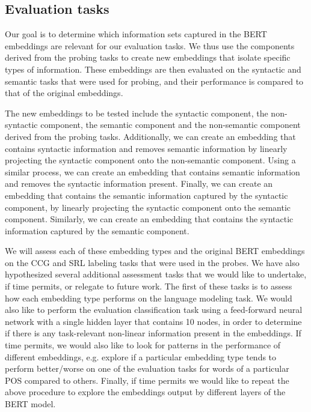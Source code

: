 \documentclass[11pt,a4paper]{article}
\begin{document}
\subsection{Evaluation tasks}

Our goal is to determine which information sets captured in the BERT embeddings are relevant for our evaluation tasks. We thus use the components derived from the probing tasks to create new embeddings that isolate specific types of information. These embeddings are then evaluated on the syntactic and semantic tasks that were used for probing, and their performance is compared to that of the original embeddings. 

The new embeddings to be tested include the syntactic component, the non-syntactic component, the semantic component and the non-semantic component derived from the probing tasks. Additionally, we can create an embedding that contains syntactic information and removes semantic information by linearly projecting the syntactic component onto the non-semantic component. Using a similar process, we can create an embedding that contains semantic information and removes the syntactic information present. Finally, we can create an embedding that contains the semantic information captured by the syntactic component, by linearly projecting the syntactic component onto the semantic component. Similarly, we can create an embedding that contains the syntactic information captured by the semantic component. 

We will assess each of these embedding types and the original BERT embeddings on the CCG and SRL labeling tasks that were used in the probes. We have also hypothesized several additional assessment tasks that we would like to undertake, if time permits, or relegate to future work. The first of these tasks is to assess how each embedding type performs on the language modeling task. We would also like to perform the evaluation classification task using a feed-forward neural network with a single hidden layer that contains 10 nodes, in order to determine if there is any task-relevant non-linear information present in the embeddings. If time permits, we would also like to look for patterns in the performance of different embeddings, e.g. explore if a particular embedding type tends to perform better/worse on one of the evaluation tasks for words of a particular POS compared to others. Finally, if time permits we would like to repeat the above procedure to explore the embeddings output by different layers of the BERT model. 
\end{document}
